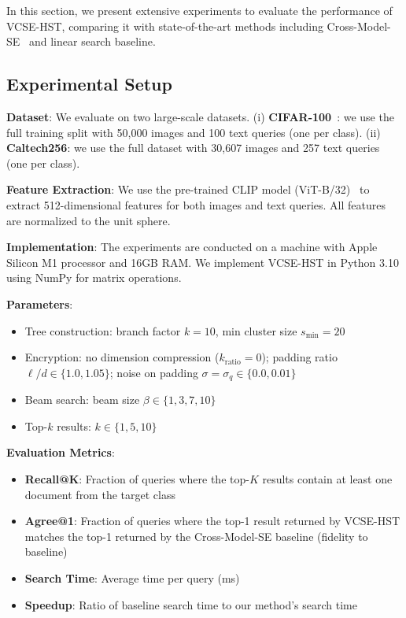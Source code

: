 \documentclass[journal]{IEEEtran}
\begin{document}
In this section, we present extensive experiments to evaluate the performance of VCSE-HST, comparing it with state-of-the-art methods including Cross-Model-SE~\cite{yang2025secure} and linear search baseline.

\subsection{Experimental Setup}
\textbf{Dataset}: We evaluate on two large-scale datasets. (i) \textbf{CIFAR-100}~\cite{krizhevsky2009learning}: we use the full training split with 50{,}000 images and 100 text queries (one per class). (ii) \textbf{Caltech256}: we use the full dataset with 30{,}607 images and 257 text queries (one per class).

\textbf{Feature Extraction}: We use the pre-trained CLIP model (ViT-B/32)~\cite{radford2021learning} to extract 512-dimensional features for both images and text queries. All features are normalized to the unit sphere.

\textbf{Implementation}: The experiments are conducted on a machine with Apple Silicon M1 processor and 16GB RAM. We implement VCSE-HST in Python 3.10 using NumPy for matrix operations.

\textbf{Parameters}:
\begin{itemize}
    \item Tree construction: branch factor $k=10$, min cluster size $s_{\min}=20$
    \item Encryption: no dimension compression ($k_{\text{ratio}}=0$); padding ratio $\ell/d \in \{1.0, 1.05\}$; noise on padding $\sigma = \sigma_q \in \{0.0, 0.01\}$
    \item Beam search: beam size $\beta \in \{1, 3, 7, 10\}$
    \item Top-$k$ results: $k \in \{1, 5, 10\}$
\end{itemize}

\textbf{Evaluation Metrics}:
\begin{itemize}
    \item \textbf{Recall@K}: Fraction of queries where the top-$K$ results contain at least one document from the target class
    \item \textbf{Agree@1}: Fraction of queries where the top-1 result returned by VCSE-HST matches the top-1 returned by the Cross-Model-SE baseline (fidelity to baseline)
    \item \textbf{Search Time}: Average time per query (ms)
    \item \textbf{Speedup}: Ratio of baseline search time to our method's search time
\end{itemize}
\end{document}
